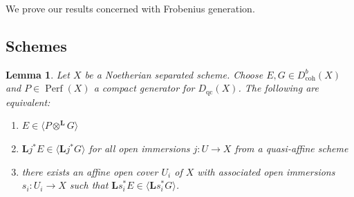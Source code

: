 \documentclass[11pt]{amsart}
\theoremstyle{plain}
\newtheorem{lemma}[theorem]{Lemma}
\theoremstyle{definition}
\numberwithin{equation}{section}
\numberwithin{theorem}{section}
\begin{document}
We prove our results concerned with Frobenius generation.

\subsection{Schemes}
\label{sec:frob_gen_scheme}

\begin{lemma}
    \label{lem:generation_is_affine_local}
    Let $X$ be a Noetherian separated scheme. 
    Choose $E,G\in D^b_{\operatorname{coh}}(X)$ and $P\in \operatorname{Perf}(X)$ a compact generator for $D_{\operatorname{qc}}(X)$. 
    The following are equivalent:
    \begin{enumerate}
        \item \label{lem:generation_is_affine_local1} $E\in \langle P \otimes^{\mathbf{L}} G \rangle$
        \item \label{lem:generation_is_affine_local2} $\mathbf{L}j^\ast E \in \langle \mathbf{L}j^\ast G \rangle$ for all open immersions $j\colon U \to X$ from a quasi-affine scheme 
        \item \label{lem:generation_is_affine_local3} there exists an affine open cover $U_i$ of $X$ with associated open immersions $s_i \colon U_i \to X$ such that $\mathbf{L}s_i^\ast E \in \langle \mathbf{L}s_i^\ast G \rangle$.
    \end{enumerate}
\end{lemma}
\end{document}
